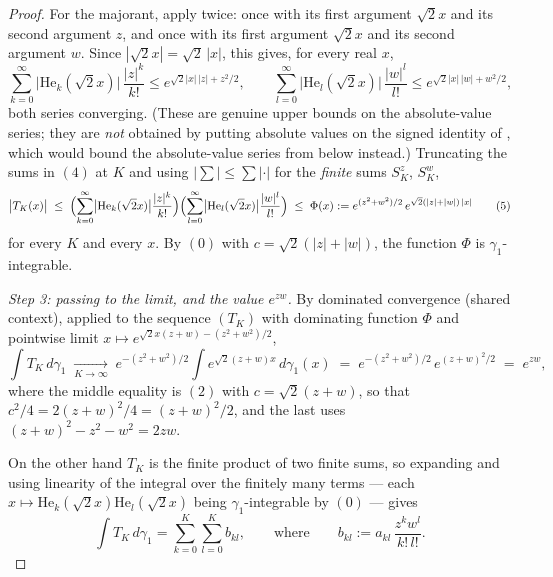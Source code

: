 \begin{proof}
For the majorant, apply  twice: once with its first
argument $\sqrt2 x$ and its second argument $z$, and once with its first
argument $\sqrt2 x$ and its second argument $w$.  Since
$|\sqrt2 x| = \sqrt2\,|x|$, this gives, for every real $x$,
\begin{equation*}
  \sum_{k=0}^\infty \bigl|\mathrm{He}_k(\sqrt2 x)\bigr|\,\frac{|z|^k}{k!}
    \leq e^{\sqrt2 |x|\,|z| + z^2/2},
  \qquad
  \sum_{l=0}^\infty \bigl|\mathrm{He}_l(\sqrt2 x)\bigr|\,\frac{|w|^l}{l!}
    \leq e^{\sqrt2 |x|\,|w| + w^2/2},
  \tag{4}
\end{equation*}
both series converging.  (These are genuine upper bounds on the
absolute-value series; they are \emph{not} obtained by putting absolute values
on the signed identity of , which would bound the
absolute-value series from below instead.)  Truncating the sums in $(4)$ at $K$
and using $|\sum| \le \sum |\cdot|$ for the \emph{finite} sums $S_K^z$, $S_K^w$,
\begin{equation*}
  \bigl|T_K(x)\bigr|
    \;\leq\;
    \Bigl(\sum_{k=0}^{\infty}\bigl|\mathrm{He}_k(\sqrt2 x)\bigr|\frac{|z|^k}{k!}\Bigr)
    \Bigl(\sum_{l=0}^{\infty}\bigl|\mathrm{He}_l(\sqrt2 x)\bigr|\frac{|w|^l}{l!}\Bigr)
    \;\leq\; \Phi(x) := e^{(z^2+w^2)/2}\, e^{\sqrt2(|z|+|w|)\,|x|}
  \tag{5}
\end{equation*}
for every $K$ and every $x$.  By $(0)$ with $c = \sqrt2(|z|+|w|)$, the function
$\Phi$ is $\gamma_1$-integrable.

\emph{Step 3: passing to the limit, and the value $e^{zw}$.}
By dominated convergence (shared context), applied to the sequence $(T_K)$ with
dominating function $\Phi$ and pointwise limit
$x \mapsto e^{\sqrt2 x(z+w) - (z^2+w^2)/2}$,
\[
  \int T_K \, d\gamma_1
    \;\xrightarrow[K\to\infty]{}\;
  e^{-(z^2+w^2)/2}\int e^{\sqrt2(z+w)x}\, d\gamma_1(x)
    \;=\; e^{-(z^2+w^2)/2}\, e^{(z+w)^2/2}
    \;=\; e^{zw},
\]
where the middle equality is $(2)$ with $c = \sqrt2(z+w)$, so that
$c^2/4 = 2(z+w)^2/4 = (z+w)^2/2$, and the last uses
$(z+w)^2 - z^2 - w^2 = 2zw$.

On the other hand $T_K$ is the finite product of two finite sums, so expanding
and using linearity of the integral over the finitely many terms --- each
$x \mapsto \mathrm{He}_k(\sqrt2 x)\mathrm{He}_l(\sqrt2 x)$ being
$\gamma_1$-integrable by $(0)$ --- gives
\begin{equation*}
  \int T_K\, d\gamma_1
    = \sum_{k=0}^{K}\sum_{l=0}^{K} b_{kl},
  \qquad\text{where}\qquad
  b_{kl} := a_{kl}\,\frac{z^k w^l}{k!\,l!}.
  \tag{6}
\end{equation*}


\end{proof}
